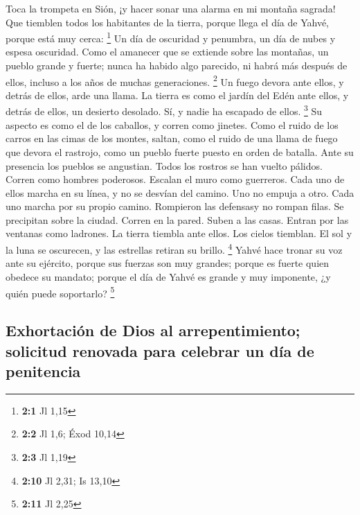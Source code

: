  Toca la trompeta en Sión, ¡y hacer sonar una alarma en mi
montaña sagrada! Que tiemblen todos los habitantes de la tierra, porque
llega el día de Yahvé, porque está muy cerca: \footnote{\textbf{2:1} Jl
  1,15}  Un día de oscuridad y penumbra, un día de nubes y
espesa oscuridad. Como el amanecer que se extiende sobre las montañas,
un pueblo grande y fuerte; nunca ha habido algo parecido, ni habrá más
después de ellos, incluso a los años de muchas generaciones. \footnote{\textbf{2:2}
  Jl 1,6; Éxod 10,14}  Un fuego devora ante ellos, y
detrás de ellos, arde una llama. La tierra es como el jardín del Edén
ante ellos, y detrás de ellos, un desierto desolado. Sí, y nadie ha
escapado de ellos. \footnote{\textbf{2:3} Jl 1,19}  Su
aspecto es como el de los caballos, y corren como jinetes.
 Como el ruido de los carros en las cimas de los montes,
saltan, como el ruido de una llama de fuego que devora el rastrojo, como
un pueblo fuerte puesto en orden de batalla.  Ante su
presencia los pueblos se angustian. Todos los rostros se han vuelto
pálidos.  Corren como hombres poderosos. Escalan el muro
como guerreros. Cada uno de ellos marcha en su línea, y no se desvían
del camino.  Uno no empuja a otro. Cada uno marcha por su
propio camino. Rompieron las defensasy no rompan filas. 
Se precipitan sobre la ciudad. Corren en la pared. Suben a las casas.
Entran por las ventanas como ladrones.  La tierra tiembla
ante ellos. Los cielos tiemblan. El sol y la luna se oscurecen, y las
estrellas retiran su brillo. \footnote{\textbf{2:10} Jl 2,31; Is 13,10}
 Yahvé hace tronar su voz ante su ejército, porque sus
fuerzas son muy grandes; porque es fuerte quien obedece su mandato;
porque el día de Yahvé es grande y muy imponente, ¿y quién puede
soportarlo? \footnote{\textbf{2:11} Jl 2,25}

\hypertarget{exhortaciuxf3n-de-dios-al-arrepentimiento-solicitud-renovada-para-celebrar-un-duxeda-de-penitencia}{%
\subsection{Exhortación de Dios al arrepentimiento; solicitud renovada
para celebrar un día de
penitencia}\label{exhortaciuxf3n-de-dios-al-arrepentimiento-solicitud-renovada-para-celebrar-un-duxeda-de-penitencia}}

